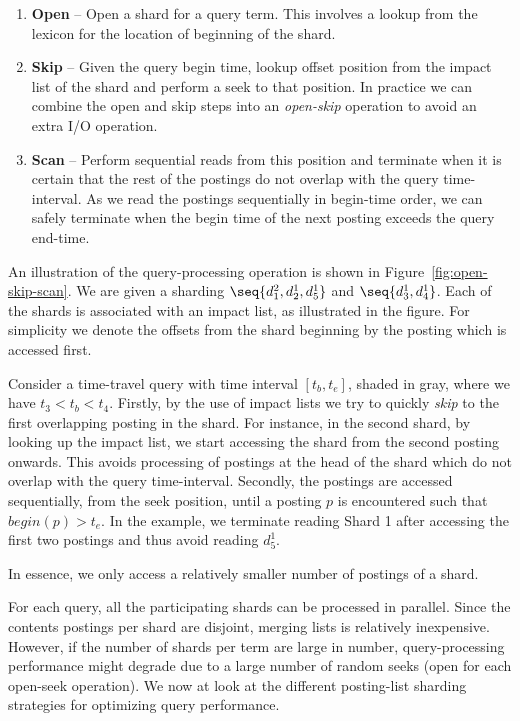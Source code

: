 \begin{enumerate}
\item \textbf{Open} -- Open a shard for a query term. This involves a lookup from the lexicon for the location of beginning of the shard.

\item \textbf{Skip} -- Given the query begin time, lookup offset 
position from the impact list of the shard and perform a seek to that 
position. In practice we can combine the open and skip steps into an
\emph{open-skip} operation to avoid an extra I/O operation. 

\item \textbf{Scan} -- Perform sequential reads from this position and
  terminate when it is certain that the rest of the postings do not overlap
  with the query time-interval. As we read the postings sequentially in
  begin-time order, we can safely terminate when the begin time of the
  next posting exceeds the query end-time.
\end{enumerate}

An illustration of the query-processing operation is shown in Figure~\ref{fig:open-skip-scan}. We are given a sharding $\seq{ d_1^2, d_2^1, d_5^1}$ and $\seq{ d_3^1, d_4^1}$. Each of the shards is associated with an impact list, as illustrated in the figure. For simplicity we denote the offsets from the shard beginning by the posting which is accessed first. 

Consider a time-travel query with time interval $[ t_b, t_e]$, shaded in gray, where we have $ t_3 < t_b < t_4$. Firstly, by the use of impact lists we try to quickly \emph{skip} to the first overlapping posting in the shard. For instance, in the second shard, by looking up the impact list, we start accessing the shard from the second posting onwards. This avoids processing of postings at the head of the shard which do not overlap with the query time-interval. Secondly, the postings are accessed sequentially, from the seek position, until a posting $p$ is encountered such that $begin(p) > t_e$. In the example, we terminate reading Shard 1 after accessing the first two postings and thus avoid reading $d_5^1$.

In essence, we only access a relatively smaller number of postings of a shard. 

For each query, all the participating shards can be processed in parallel. Since the contents postings per shard are disjoint, merging lists is relatively inexpensive. However, if the number of shards per term are large in number, query-processing performance might degrade due to a large number of random seeks (open for each open-seek operation). We now at look at the different posting-list sharding strategies for optimizing query performance.


